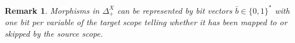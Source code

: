 \documentclass[aspectratio=169]{beamer}
\theoremstyle{remarkstyle}
\newtheorem*{remark}{Remark}
\begin{document}
\begin{frame}[fragile]
\begin{definition}
\begin{columns}
      \begin{column}{0.3\textwidth}
      \end{column}
    \end{columns}
  \end{definition}
  \begin{remark}
    Morphisms in $Δ_+^X$ can be represented by \emph{bit vectors} $\bar{b} ∈ \{0, 1\}^*$ with one bit per variable of the target scope telling whether it has been mapped to or skipped by the source scope.
  \end{remark}
\end{frame}
\end{document}
